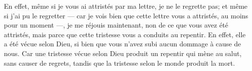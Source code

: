 En effet, même si je vous ai attristés par ma lettre, je ne le regrette pas;
	et même si j’ai pu le regretter
	--- car je vois bien que cette lettre vous a attristés,
		au moins pour un moment ---,
	je me réjouis maintenant, non de ce que vous avez été attristés,
	mais parce que cette tristesse vous a conduits au repentir.
En effet, elle a été vécue selon Dieu,
	si bien que vous n’avez subi aucun dommage à cause de nous.
Car une tristesse vécue selon Dieu produit un repentir qui mène au salut,
		sans causer de regrets,
	tandis que la tristesse selon le monde produit la mort.
